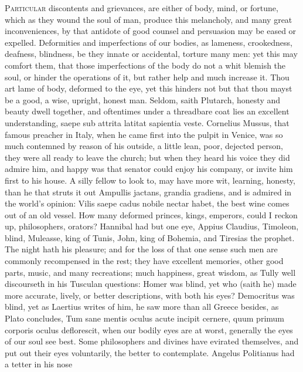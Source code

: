 {\lettrine{P}{articular} discontents and grievances, are either of body, mind, or
fortune, which as they wound the soul of man, produce this melancholy,
and many great inconveniences, by that antidote of good counsel and
persuasion may be eased or expelled. Deformities and imperfections of
our bodies, as lameness, crookedness, deafness, blindness, be they
innate or accidental, torture many men: yet this may comfort them, that
those imperfections of the body do not a whit blemish the soul, or
hinder the operations of it, but rather help and much increase it. Thou
art lame of body, deformed to the eye, yet this hinders not but that
thou mayst be a good, a wise, upright, honest man. Seldom, saith
Plutarch, honesty and beauty dwell together, and oftentimes under a
threadbare coat lies an excellent understanding, saepe sub attrita
latitat sapientia veste. Cornelius Mussus, that famous preacher
in Italy, when he came first into the pulpit in Venice, was so much
contemned by reason of his outside, a little lean, poor, dejected
person, they were all ready to leave the church; but when they
heard his voice they did admire him, and happy was that senator could
enjoy his company, or invite him first to his house. A silly fellow to
look to, may have more wit, learning, honesty, than he that struts it
out Ampullis jactans, \etc{} grandia gradiens, and is admired in the
world's opinion: Vilis saepe cadus nobile nectar habet, the best wine
comes out of an old vessel. How many deformed princes, kings, emperors,
could I reckon up, philosophers, orators? Hannibal had but one eye,
Appius Claudius, Timoleon, blind, Muleasse, king of Tunis, John, king
of Bohemia, and Tiresias the prophet. The night hath his
pleasure; and for the loss of that one sense such men are commonly
recompensed in the rest; they have excellent memories, other good
parts, music, and many recreations; much happiness, great wisdom, as
Tully well discourseth in his  Tusculan questions: Homer was
blind, yet who (saith he) made more accurate, lively, or better
descriptions, with both his eyes? Democritus was blind, yet as Laertius
writes of him, he saw more than all Greece besides, as Plato
concludes, Tum sane mentis oculus acute incipit cernere, quum primum
corporis oculus deflorescit, when our bodily eyes are at worst,
generally the eyes of our soul see best. Some philosophers and divines
have evirated themselves, and put out their eyes voluntarily, the
better to contemplate. Angelus Politianus had a tetter in his nose
}
